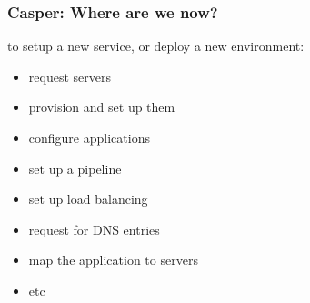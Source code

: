 \documentclass[bigger]{beamer}
\begin{document}
\begin{frame}
\frametitle{Casper: Where are we now?}
\label{sec-1-10}


to setup a new service, or deploy a new environment: 

\begin{itemize}
\item request servers
\item provision and set up them
\item configure applications
\item set up a pipeline
\item set up load balancing
\item request for DNS entries
\item map the application  to servers
\item etc
\end{itemize}
\end{frame}
\end{document}
